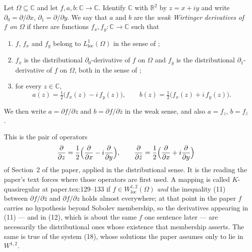 \begin{definition}
Let $\Omega\subseteq\mathbb{C}$ and let $f,a,b\colon\mathbb{C}\to\mathbb{C}$.
Identify $\mathbb{C}$ with $\mathbb{R}^2$ by $z=x+iy$ and write
$\partial_0=\partial/\partial x$, $\partial_1=\partial/\partial y$.  We say
that $a$ and $b$ are the \emph{weak Wirtinger derivatives of $f$ on $\Omega$}
if there are functions $f_x,f_y\colon\mathbb{C}\to\mathbb{C}$ such that
\begin{enumerate}
\item[(a)] $f$, $f_x$ and $f_y$ belong to $L^1_{\mathrm{loc}}(\Omega)$ in the
sense of ;
\item[(b)] $f_x$ is the distributional $\partial_0$-derivative of $f$ on
$\Omega$ and $f_y$ is the distributional $\partial_1$-derivative of $f$ on
$\Omega$, both in the sense of ;
\item[(c)] for every $z\in\mathbb{C}$,
\[
  a(z)=\tfrac12\bigl(f_x(z)-i\,f_y(z)\bigr),
  \qquad
  b(z)=\tfrac12\bigl(f_x(z)+i\,f_y(z)\bigr).
\]
\end{enumerate}
We then write $a=\partial f/\partial z$ and $b=\partial f/\partial\bar z$ in
the weak sense, and also $a=f_z$, $b=f_{\bar z}$.

This is the pair of operators
\[
  \frac{\partial}{\partial z}=\frac12\Bigl(\frac{\partial}{\partial x}-i\frac{\partial}{\partial y}\Bigr),
  \qquad
  \frac{\partial}{\partial\bar z}=\frac12\Bigl(\frac{\partial}{\partial x}+i\frac{\partial}{\partial y}\Bigr)
\]
of Section~2 of the paper, applied in the distributional sense.  It is the
reading the paper's text forces where those operators are first used.  A
mapping is called $K$-quasiregular at paper.tex:129--133 if
$f\in W^{1,2}_{\mathrm{loc}}(\Omega)$ \emph{and} the inequality (11) between
$\partial f/\partial\bar z$ and $\partial f/\partial z$ holds almost
everywhere; at that point in the paper $f$ carries no hypothesis beyond
Sobolev membership, so the derivatives appearing in (11) --- and in (12),
which is about the same $f$ one sentence later --- are necessarily the
distributional ones whose existence that membership asserts.  The same is true
of the system (18), whose solutions the paper assumes only to lie in
$W^{1,2}$.


\end{definition}
